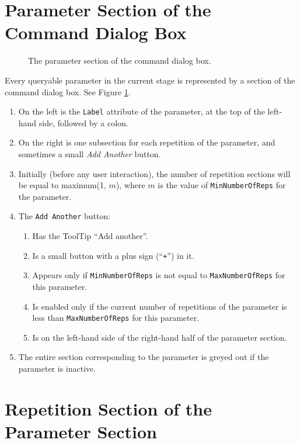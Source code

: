 \documentclass[11pt]{article}
\begin{document}
\section{Parameter Section of the Command Dialog Box}

\begin{figure}

\centerline{\epsfxsize=5.5in }

\caption{
  The parameter section of the command dialog box.
}
\label{parameterSectionFig}
\end{figure}

Every queryable parameter in the current stage is represented by a section
of the command dialog box.  See Figure \ref{parameterSectionFig}.
\begin{enumerate}
\item On the left is the {\tt Label} attribute of the parameter,
  at the top of the left-hand side, followed by a colon.
\item On the right is one subsection for each repetition of the parameter,
  and sometimes a small {\it Add Another} button.
\item Initially (before any user interaction), the number of repetition
  sections will be equal to maximum(1, $m$), where $m$ is the value of
 {\tt MinNumberOfReps} for the parameter.
\item The {\tt Add Another} button:
  \begin{enumerate}
  \item Has the ToolTip ``Add another''.
  \item Is a small button with a plus sign (``{\tt +}'') in it.
  \item Appears only if {\tt MinNumberOfReps} is not equal to
    {\tt MaxNumberOfReps} for this parameter.
  \item Is enabled only if the current number of repetitions of the
    parameter is less than {\tt MaxNumberOfReps} for this parameter.
  \item Is on the left-hand side of the right-hand half of the parameter
    section.
  \end{enumerate}
\item The entire section corresponding to the parameter is greyed out
  if the parameter is inactive.
\end{enumerate}

\section{Repetition Section of the Parameter Section}
\end{document}
